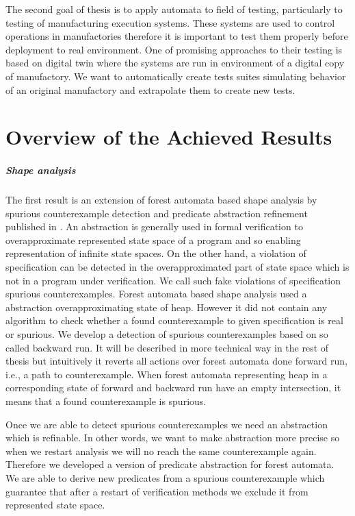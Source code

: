 The second goal of thesis is to apply automata to field of testing, particularly
to testing of manufacturing execution systems.
These systems are used to control operations in manufactories therefore it is
important to test them properly before deployment to real environment.
One of promising approaches to their testing is based on digital twin where
the systems are run in environment of a digital copy of manufactory.
We want to automatically create tests suites simulating behavior of an original
manufactory and extrapolate them to create new tests.

\section{Overview of the Achieved Results}
\subparagraph{Shape analysis}
The first result is an extension of forest automata based shape analysis by
spurious counterexample detection and predicate abstraction refinement published in \cite{vmcai17}.
An abstraction is generally used in formal verification to overapproximate
represented state space of a program and so enabling representation of infinite
state spaces.
On the other hand, a violation of specification can be detected in the overapproximated
part of state space which is not in a program under verification.
We call such fake violations of specification spurious counterexamples.
Forest automata based shape analysis used a abstraction overapproximating
state of heap.
However it did not contain any algorithm to check whether a found counterexample
to given specification is real or spurious.
We develop a detection of spurious counterexamples based on so called backward run.
It will be described in more technical way in the rest of thesis but intuitively it
reverts all actions over forest automata done forward run, i.e., a path to counterexample.
When forest automata representing heap in a corresponding state of forward and
backward run have an empty intersection, it means that a found counterexample is spurious.

Once we are able to detect spurious counterexamples we need an abstraction which is refinable. 
In other words, we want to make abstraction more precise so when we restart analysis
we will no reach the same counterexample again.
Therefore we developed a version of predicate abstraction for forest automata.
We are able to derive new predicates from a spurious counterexample which
guarantee that after a restart of verification methods we exclude it
from represented state space.


